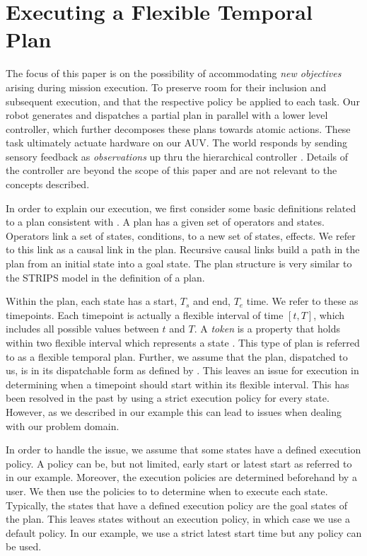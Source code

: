 \section{Executing a Flexible Temporal Plan}
\label{sec: defs}

The focus of this paper is on the possibility of accommodating \emph{new
  objectives} arising during mission execution. 
To preserve room for their inclusion and subsequent execution, and
that the respective policy be applied to each task. Our robot generates and
dispatches a partial plan in parallel with a lower level controller,
which further decomposes these plans towards atomic actions. These
task ultimately actuate hardware on our AUV. The world responds by
sending sensory feedback as \emph{observations} up thru the
hierarchical controller \cite{mcgann08bdup,rajan12dup}. Details of the
controller are beyond the scope of this paper and are not relevant to the
concepts described. 

In order to explain our execution, we first consider some basic definitions related to a plan
consistent with \cite{Nau:2004}. A plan has a given set of operators and states.
Operators link a set of states, conditions, to a new set of states, effects. We 
refer to this link as a causal link in the plan. Recursive causal links build a path
in the plan from an initial state into a goal state. The plan structure is very similar to the
STRIPS model in the definition of a plan. 

Within the plan, each state has a start, $T_s$ and end, $T_e$ time. We refer to
these as timepoints. Each timepoint is actually a flexible interval of time $[t, T]$, which
includes all possible values between $t$ and $T$. 
A \emph{token} is a property that holds within two flexible interval which represents a state \cite{py10dup}. 
This type of plan is referred to as a flexible temporal plan. Further, we assume that the
plan, dispatched to us, is in its dispatchable form as defined by \cite{mus98a}.  This leaves an issue 
for execution in determining when a timepoint should start within its flexible interval. This has been
resolved in the past by using a strict execution policy for every state. However, as we described in our
example this can lead to issues when dealing with our problem domain.

In order to handle the issue, we assume that some states have a defined execution policy. 
A policy can be, but not limited, early start or latest start as referred to in our example.  Moreover, the
execution policies are determined beforehand by a user. We then use the policies to 
to determine when to execute each state. Typically, the states that have a defined
execution policy are the goal states of the plan. This leaves states without an execution policy,
in which case we use a default policy. In our example, we use a strict latest start time but any policy can 
be used. 


